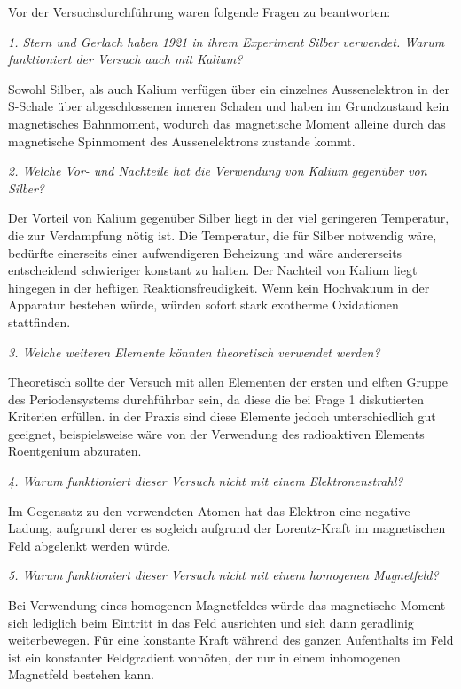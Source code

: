 \documentclass[a4paper,parskip,11pt, DIV12]{scrreprt}
\begin{document}
 Vor der Versuchsdurchführung waren folgende Fragen zu beantworten:
 
 \textit{1. Stern und Gerlach haben 1921 in ihrem Experiment Silber verwendet. Warum funktioniert der
Versuch auch mit Kalium?}

Sowohl Silber, als auch Kalium verfügen über ein einzelnes Aussenelektron in der S-Schale über abgeschlossenen inneren Schalen und haben im Grundzustand kein magnetisches Bahnmoment, wodurch das magnetische Moment alleine durch das magnetische Spinmoment des Aussenelektrons zustande kommt.

\textit{2. Welche Vor- und Nachteile hat die Verwendung von Kalium gegenüber von Silber?}

Der Vorteil von Kalium gegenüber Silber liegt in der viel geringeren Temperatur, die zur Verdampfung nötig ist. Die Temperatur, die für Silber notwendig wäre, bedürfte einerseits einer aufwendigeren Beheizung und wäre andererseits entscheidend schwieriger konstant zu halten. Der Nachteil von Kalium liegt hingegen in der heftigen Reaktionsfreudigkeit. Wenn kein Hochvakuum in der Apparatur bestehen würde, würden sofort stark exotherme Oxidationen stattfinden.

\textit{3. Welche weiteren Elemente könnten theoretisch verwendet werden?}

Theoretisch sollte der Versuch mit allen Elementen der ersten und elften Gruppe des Periodensystems durchführbar sein, da diese die bei Frage 1 diskutierten Kriterien erfüllen. in der Praxis sind diese Elemente jedoch unterschiedlich gut geeignet, beispielsweise wäre von der Verwendung des radioaktiven Elements Roentgenium abzuraten.

\textit{4. Warum funktioniert dieser Versuch nicht mit einem Elektronenstrahl?}

Im Gegensatz zu den verwendeten Atomen hat das Elektron eine negative Ladung, aufgrund derer es sogleich aufgrund der Lorentz-Kraft im magnetischen Feld abgelenkt werden würde.

\textit{5. Warum funktioniert dieser Versuch nicht mit einem homogenen Magnetfeld?}

Bei Verwendung eines homogenen Magnetfeldes würde das magnetische Moment sich lediglich beim Eintritt in das Feld ausrichten und sich dann geradlinig weiterbewegen. Für eine konstante Kraft während des ganzen Aufenthalts im Feld ist ein konstanter Feldgradient vonnöten, der nur in einem inhomogenen Magnetfeld bestehen kann.
\end{document}
